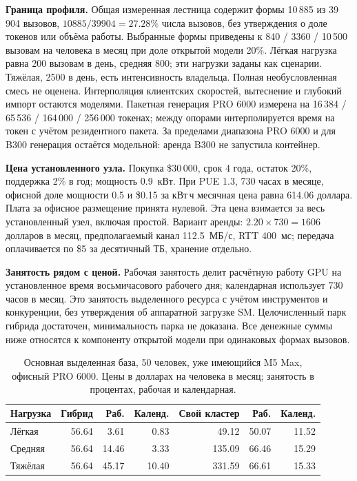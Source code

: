 \textbf{Граница профиля.} Общая измеренная лестница содержит формы 10\,885 из 39\,904 вызовов,
$10885/39904=27.28\%$ числа вызовов, без утверждения о доле токенов или объёма работы.
Выбранные формы приведены к 840 / 3360 / 10\,500 вызовам на человека в месяц при доле открытой модели 20\%.
Лёгкая нагрузка равна 200 вызовам в день, средняя 800; эти нагрузки заданы как сценарии. Тяжёлая, 2500 в день,
есть интенсивность владельца. Полная необусловленная смесь не оценена.
Интерполяция клиентских скоростей, вытеснение и глубокий импорт остаются моделями.
Пакетная генерация PRO 6000 измерена на 16\,384 / 65\,536 / 164\,000 / 256\,000 токенах;
между опорами интерполируется время на токен с учётом резидентного пакета.
За пределами диапазона PRO 6000 и для B300 генерация остаётся модельной: аренда B300 не запустила контейнер.

\textbf{Цена установленного узла.} Покупка \$30\,000, срок 4 года, остаток 20\%, поддержка 2\% в год;
мощность 0.9~кВт. При PUE 1.3, 730 часах в месяце, офисной доле мощности 0.5 и \$0.15 за кВт\,ч
месячная цена равна 614.06 доллара. Плата за офисное размещение принята нулевой.
Эта цена взимается за весь установленный узел, включая простой.
Вариант аренды: $2.20\times730=1606$ долларов в месяц, предполагаемый канал 112.5~МБ/с, RTT 400~мс;
передача оплачивается по \$5 за десятичный ТБ, хранение отдельно.

\textbf{Занятость рядом с ценой.} Рабочая занятость делит расчётную работу GPU на установленное время
восьмичасового рабочего дня; календарная использует 730 часов в месяц. Это занятость выделенного ресурса с учётом
инструментов и конкуренции, без утверждения об аппаратной загрузке SM. Целочисленный парк гибрида достаточен,
минимальность парка не доказана. Все денежные суммы ниже относятся к компоненту открытой модели при одинаковых формах вызовов.

\begin{table}[t]
\centering
\caption{Основная выделенная база, 50 человек, уже имеющийся M5 Max, офисный PRO 6000.
Цены в долларах на человека в месяц; занятость в процентах, рабочая и календарная.}
\label{tab:r22-dedicated50}
\footnotesize
\begin{tabular}{lrrrrrr}
\toprule
Нагрузка & Гибрид & Раб. & Календ. & Свой кластер & Раб. & Календ. \\
\midrule
Лёгкая & 56.64 & 3.61 & 0.83 & 49.12 & 50.07 & 11.52 \\
Средняя & 56.64 & 14.46 & 3.33 & 135.09 & 66.46 & 15.29 \\
Тяжёлая & 56.64 & 45.17 & 10.40 & 331.59 & 66.61 & 15.33 \\
\bottomrule
\end{tabular}
\end{table}

